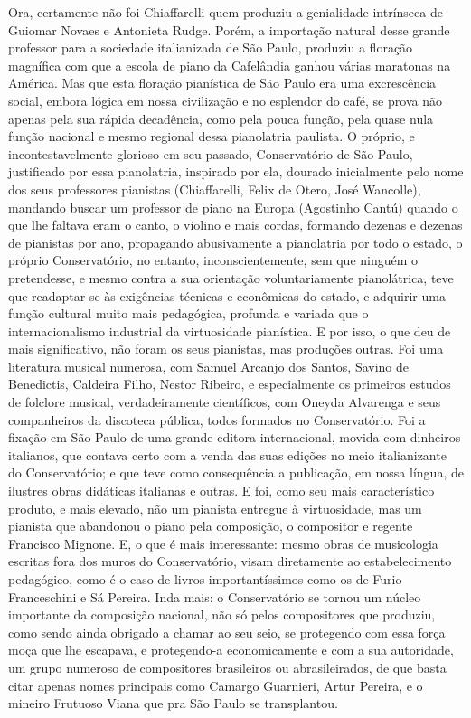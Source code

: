 Ora, certamente não foi Chiaffarelli quem produziu a genialidade
intrínseca de Guiomar Novaes e Antonieta Rudge. Porém, a importação
natural desse grande professor para a sociedade italianizada de São
Paulo, produziu a floração magnífica com que a escola de piano da
Cafelândia ganhou várias maratonas na América. Mas que esta floração
pianística de São Paulo era uma excrescência social, embora lógica em
nossa civilização e no esplendor do café, se prova não apenas pela sua
rápida decadência, como pela pouca função, pela quase nula função
nacional e mesmo regional dessa pianolatria paulista. O próprio, e
incontestavelmente glorioso em seu passado, Conservatório de São Paulo,
justificado por essa pianolatria, inspirado por ela, dourado
inicialmente pelo nome dos seus professores pianistas (Chiaffarelli,
Felix de Otero, José Wancolle), mandando buscar um professor de piano na
Europa (Agostinho Cantú) quando o que lhe faltava eram o canto, o
violino e mais cordas, formando dezenas e dezenas de pianistas por ano,
propagando abusivamente a pianolatria por todo o estado, o próprio
Conservatório, no entanto, inconscientemente, sem que ninguém o
pretendesse, e mesmo contra a sua orientação voluntariamente
pianolátrica, teve que readaptar-se às exigências técnicas e econômicas
do estado, e adquirir uma função cultural muito mais pedagógica,
profunda e variada que o internacionalismo industrial da virtuosidade
pianística. E por isso, o que deu de mais significativo, não foram os
seus pianistas, mas produções outras. Foi uma literatura musical
numerosa, com Samuel Arcanjo dos Santos, Savino de Benedictis, Caldeira
Filho, Nestor Ribeiro, e especialmente os primeiros estudos de folclore
musical, verdadeiramente científicos, com Oneyda Alvarenga e seus
companheiros da discoteca pública, todos formados no Conservatório. Foi
a fixação em São Paulo de uma grande editora internacional, movida com
dinheiros italianos, que contava certo com a venda das suas edições no
meio italianizante do Conservatório; e que teve como consequência a
publicação, em nossa língua, de ilustres obras didáticas italianas e
outras. E foi, como seu mais característico produto, e mais elevado, não
um pianista entregue à virtuosidade, mas um pianista que abandonou o
piano pela composição, o compositor e regente Francisco Mignone. E, o
que é mais interessante: mesmo obras de musicologia escritas fora dos
muros do Conservatório, visam diretamente ao estabelecimento pedagógico,
como é o caso de livros importantíssimos como os de Furio Franceschini e
Sá Pereira. Inda mais: o Conservatório se tornou um núcleo importante da
composição nacional, não só pelos compositores que produziu, como sendo
ainda obrigado a chamar ao seu seio, se protegendo com essa força moça
que lhe escapava, e protegendo-a economicamente e com a sua autoridade,
um grupo numeroso de compositores brasileiros ou abrasileirados, de que
basta citar apenas nomes principais como Camargo Guarnieri, Artur
Pereira, e o mineiro Frutuoso Viana que pra São Paulo se transplantou.

